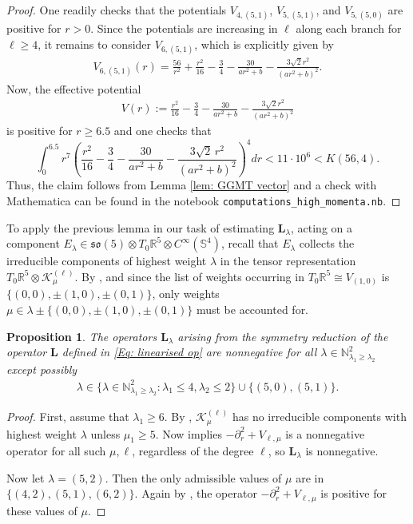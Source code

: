 \documentclass[11pt,reqno]{amsart}
\newtheorem{proposition}{Proposition}[section]
\theoremstyle{remark}
\theoremstyle{definition}
\newcommand{\sov}{\mathfrak{so}(5)}
\begin{document}
\begin{proof}
One readily checks that the potentials \(V_{4,(5,1)}\), \(V_{5,(5,1)}\), and \(V_{5,(5,0)}\) are positive for \(r>0\). Since the potentials are increasing in \(\ell\) along each branch for \(\ell\geq4\), it remains to consider \(V_{6,(5,1)}\), which is explicitly given by
\begin{align*}
V_{6,(5,1)}(r)
=
\frac{56}{r^2}+\frac{r^2}{16}-\frac34
-\frac{30}{a r^2+b}
-\frac{3\sqrt2 r^2}
{(a r^2+b)^2}.
\end{align*}
Now, the effective potential
\begin{align*}
V(r):=
\frac{r^2}{16}-\frac34
-\frac{30}{a r^2+b}
-\frac{3\sqrt2 r^2}
{(a r^2+b)^2}
\end{align*}
is positive for $r\geq 6.5$ and one checks that
\[
\int_0^{6.5} r^7
\left(
\frac{r^2}{16}-\frac34
-\frac{30}{ar^2+b}
-\frac{3\sqrt2\,r^2}{(ar^2+b)^2}
\right)^4dr < 11\cdot 10^6< K(56,4).
\]
Thus, the claim follows from Lemma \ref{lem: GGMT vector} and a check with Mathematica can be found in the notebook 
\texttt{computations\_high\_momenta.nb}.
\end{proof}

To apply the previous lemma in our task of estimating $\mathbf L_\lambda$, acting on a component $E_\lambda \in \sov \otimes T_0 \mathbb R^5 \otimes C^\infty(\mathbb S^4)$, recall that $E_\lambda$ collects the irreducible components of highest weight $\lambda$ in the tensor representation $T_0\mathbb R^5 \otimes \mathcal K^{(\ell)}_{\mu}$. By , and since the list of weights occurring in $T_0 \mathbb R^5 \cong V_{(1,0)}$ is $\{(0,0), \pm (1,0), \pm (0,1)\}$, only weights $\mu \in \lambda \pm \{(0,0), \pm (1,0), \pm (0,1)\}$ must be accounted for.

\begin{proposition}
    The operators $\mathbf L_{\lambda}$ arising from the symmetry reduction of the operator $\mathbf L$ defined in \eqref{Eq: linearised op} are nonnegative for all $\lambda \in \mathbb N^2_{\lambda_1 \geq \lambda_2}$ except possibly
    \begin{align*}
        \lambda \in \{\lambda \in \mathbb N^2_{\lambda_1 \geq \lambda_2}: \lambda_1 \leq 4, \lambda_2 \leq 2\} \cup \{(5,0),(5,1)\}.
    \end{align*}
\end{proposition}

\begin{proof}
    First, assume that $\lambda_1 \geq 6$. By , $\mathcal K^{(\ell)}_\mu$ has no irreducible components with highest weight $\lambda$ unless $\mu_1 \geq 5$. Now  implies $- \partial_r^2 + V_{\ell,\mu}$ is a nonnegative operator for all such $\mu,\ell$, regardless of the degree $\ell$, so $\mathbf L_\lambda$ is nonnegative.

    Now let $\lambda = (5,2)$. Then the only admissible values of $\mu$ are in $\{(4,2),(5,1),(6,2)\}$. Again by , the operator $- \partial_r^2 + V_{\ell,\mu}$ is positive for these values of $\mu$.
\end{proof}
\end{document}
